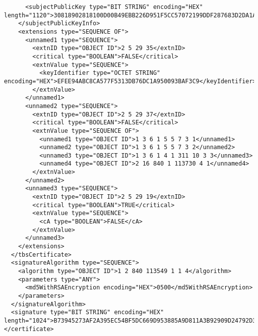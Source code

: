 \begin{verbatim}
      <subjectPublicKey type="BIT STRING" encoding="HEX" length="1120">30818902818100D00B49EBB226D951F5CC57072199DDF287683D2DA1A0EFCC96BFF73164777C78C3991E92EDA66584E7B97BAB4BE68D595D225557E01E7E57B5C35C04B491948C5C427AD588D8C6989764996D6D44E17B65CCFC86F3B4842DE559B730C1DE3AEF1CE1A328AFF8A357EBA911E1F7E8FC1598E21E4BF721748C587F50CF46157D950203010001</subjectPublicKey>
    </subjectPublicKeyInfo>
    <extensions type="SEQUENCE OF">
      <unnamed1 type="SEQUENCE">
        <extnID type="OBJECT ID">2 5 29 35</extnID>
        <critical type="BOOLEAN">FALSE</critical>
        <extnValue type="SEQUENCE">
          <keyIdentifier type="OCTET STRING" encoding="HEX">EFEE94ABC8CA577F5313DB76DC1A950093BAF3C9</keyIdentifier>
        </extnValue>
      </unnamed1>
      <unnamed2 type="SEQUENCE">
        <extnID type="OBJECT ID">2 5 29 37</extnID>
        <critical type="BOOLEAN">FALSE</critical>
        <extnValue type="SEQUENCE OF">
          <unnamed1 type="OBJECT ID">1 3 6 1 5 5 7 3 1</unnamed1>
          <unnamed2 type="OBJECT ID">1 3 6 1 5 5 7 3 2</unnamed2>
          <unnamed3 type="OBJECT ID">1 3 6 1 4 1 311 10 3 3</unnamed3>
          <unnamed4 type="OBJECT ID">2 16 840 1 113730 4 1</unnamed4>
        </extnValue>
      </unnamed2>
      <unnamed3 type="SEQUENCE">
        <extnID type="OBJECT ID">2 5 29 19</extnID>
        <critical type="BOOLEAN">TRUE</critical>
        <extnValue type="SEQUENCE">
          <cA type="BOOLEAN">FALSE</cA>
        </extnValue>
      </unnamed3>
    </extensions>
  </tbsCertificate>
  <signatureAlgorithm type="SEQUENCE">
    <algorithm type="OBJECT ID">1 2 840 113549 1 1 4</algorithm>
    <parameters type="ANY">
      <md5WithRSAEncryption encoding="HEX">0500</md5WithRSAEncryption>
    </parameters>
  </signatureAlgorithm>
  <signature type="BIT STRING" encoding="HEX" length="1024">B73945273AF2A395EC54BF5DC669D953885A9D811A3B92909D24792D36A44EC27E1C463AF8738BEFD29B311CCE8C6D9661BEC30911DAABB39B8813382B32D2E259581EBCD26C495C083984763966FF35D1DEFE432891E610C85072578DA7423244A8F5997B41A1F44E61F4F22C94375775055A5E72F25D5E4557467A91BD4251</signature>
</certificate>

\end{verbatim}
